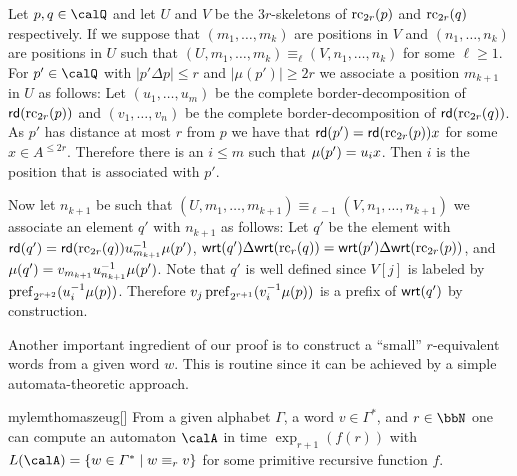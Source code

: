 \begin{definition}
	Let $p,q\in \Qx$ and let $U$ and $V$ be the $3r$-skeletons of $\operatorname{rc}_{2r}(p)$ and $\operatorname{rc}_{2r}(q)$ respectively. If we suppose that $(m_1,\ldots,m_k)$ are positions in $V$ and $(n_1,\ldots,n_k)$ are positions in $U$ such that $(U,m_1,\ldots,m_k) \equiv_{\ell} (V,n_1,\ldots,n_k)$ for some $\ell \geq 1$. For $p'\in \Qx$ with $|p'\Delta p| \leq r$ and $|\mu(p')| \geq 2r$ we associate a position $m_{k+1}$ in $U$ as follows:
	Let $(u_1,\ldots, u_m)$ be the complete border-decomposition of $\mathsf{rd}(\operatorname{rc}_{2r}(p))$ and $(v_1,\ldots,v_n)$ be the complete border-decomposition of $\mathsf{rd}(\operatorname{rc}_{2r}(q))$. As $p'$ has distance at most $r$ from $p$ we have that $\mathsf{rd}(p') = \mathsf{rd}(\operatorname{rc}_{2r}(p))x$
	for some $x\in A^{\leq 2r}$. Therefore there is an $i\leq m$ such that $\mu(p') = u_ix$. Then $i$ is the position that is associated with $p'$.
	
	Now let $n_{k+1}$ be such that $(U,m_1,\ldots,m_{k+1}) \equiv_{\ell-1} (V,n_1,\ldots,n_{k+1})$ we associate an element $q'$ with $n_{k+1}$ as follows:
	Let $q'$ be the element with $\mathsf{rd}(q') = \mathsf{rd}(\operatorname{rc}_{2r}(q))u_{m_{k+1}}^{-1}\mu(p')$, $\mathsf{wrt}(q')\Delta\mathsf{wrt}(\operatorname{rc}_r({q})) = \mathsf{wrt}(p')\Delta\mathsf{wrt}(\operatorname{rc}_{2r}({p}))$, and 
	$\mu(q') = v_{m_{k+1}}u_{n_{k+1}}^{-1}\mu(p')$. Note that $q'$ is well defined since $V[j]$ is labeled by $\operatorname{pref}_{2^{r+2}}(u_i^{-1}\mu(p))$. Therefore $v_j\operatorname{pref}_{2^{r+1}}(v_i^{-1}\mu(p))$ is a prefix of $\mathsf{wrt}(q')$ by construction.
\end{definition}

Another important ingredient of our proof is to construct a ``small'' $r$-equivalent words from a given word $w$. This is routine since it can be achieved by a simple automata-theoretic approach.
\begin{restatable}{mylem}{thomaszeug}[\cite{Tho97}]\label{lem:r-equiv_word_construction}
	From a given alphabet $\Gamma$, a word $v\in\Gamma^\ast$, and $r\in\bbN$ one can compute an automaton $\calA$ in time $\exp_{r+1}(f(r))$ with $L(\calA) = \{w\in \Gamma^\ast\mid w\equiv_r v \}$ for some primitive recursive function $f$.
\end{restatable}


